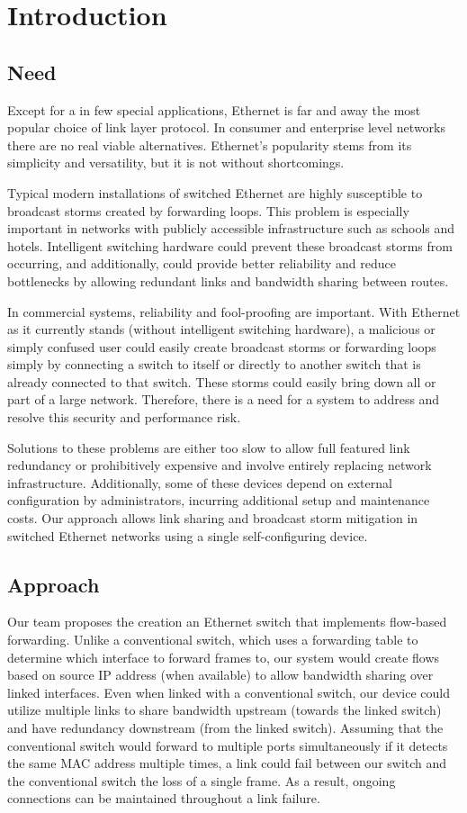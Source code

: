 \section{Introduction}
  \subsection{Need}
	  Except for a in few special applications, Ethernet is far and away the most popular choice of link layer protocol.
	  In consumer and enterprise level networks there are no real viable alternatives.
	  Ethernet's popularity stems from its simplicity and versatility, but it is not without shortcomings.

	  Typical modern installations of switched Ethernet are highly susceptible to broadcast storms created by forwarding loops.
	  This problem is especially important in networks with publicly accessible infrastructure such as schools and hotels.
	  Intelligent switching hardware could prevent these broadcast storms from occurring, and additionally, could provide better reliability and reduce bottlenecks by allowing redundant links and bandwidth sharing between routes.
	
	  In commercial systems, reliability and fool-proofing are important.
	  With Ethernet as it currently stands (without intelligent switching hardware), a malicious or simply confused user could easily create broadcast storms or forwarding loops simply by connecting a switch to itself or directly to another switch that is already connected to that switch.
	  These storms could easily bring down all or part of a large network.
	  Therefore, there is a need for a system to address and resolve this security and performance risk.
	
	  Solutions to these problems are either too slow to allow full featured link redundancy or prohibitively expensive and involve entirely replacing network infrastructure.
	  Additionally, some of these devices depend on external configuration by administrators, incurring additional setup  and maintenance costs.
	  Our approach allows link sharing and broadcast storm mitigation in switched Ethernet networks using a single self-configuring device.
  \subsection{Approach}
	  Our team proposes the creation an Ethernet switch that implements flow-based forwarding.
	  Unlike a conventional switch, which uses a forwarding table to determine which interface to forward frames to, our system would create flows based on source IP address (when available) to allow bandwidth sharing over linked interfaces.
	  Even when linked with a conventional switch, our device could utilize multiple links to share bandwidth upstream (towards the linked switch) and have redundancy downstream (from the linked switch).
	  Assuming that the conventional switch would forward to multiple ports simultaneously if it detects the same MAC address multiple times, a link could fail between our switch and the conventional switch the loss of a single frame.
	  As a result, ongoing connections can be maintained throughout a link failure.

